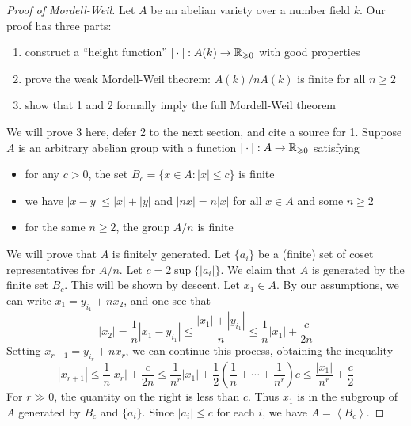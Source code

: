 \documentclass{article}
\begin{document}
\begin{proof}[Proof of Mordell-Weil]
Let $A$ be an abelian variety over a number field $k$. Our proof has three 
parts:
\begin{enumerate}
  \item construct a ``height function'' $|\cdot|:A(k)\to \mathbb{R}_{\geqslant 0}$ 
    with good properties
  \item prove the weak Mordell-Weil theorem: $A(k)/n A(k)$ is finite for all 
    $n\geqslant 2$
  \item show that 1 and 2 formally imply the full Mordell-Weil theorem 
\end{enumerate}
We will prove 3 here, defer 2 to the next section, and cite a source for 1. 
Suppose $A$ is an arbitrary abelian group with a function 
$|\cdot|:A\to \mathbb{R}_{\geqslant 0}$ satisfying 
\begin{itemize}
  \item for any $c>0$, the set $B_c = \{x\in A:|x|\leqslant c\}$ 
    is finite
  \item we have $|x-y|\leqslant |x|+|y|$ and $|n x|=n |x|$ for all 
    $x\in A$ and some $n\geqslant 2$
  \item for the same $n\geqslant 2$, the group $A/n$ is finite
\end{itemize}
We will prove that $A$ is finitely generated. Let $\{a_i\}$ be a (finite) set 
of coset representatives for $A/n$. Let $c=2\sup \{|a_i|\}$. We claim that $A$ 
is generated by the finite set $B_c$. This will be shown by 
descent. Let $x_1\in A$. By our assumptions, we can write 
$x_1 = y_{i_1} + n x_2$, and one see that 
\[
  |x_2| = \frac 1 n |x_1 - y_{i_1}| 
    \leqslant \frac{|x_1| + |y_{i_1}|}{n} 
    \leqslant \frac 1 n |x_1| + \frac{c}{2 n}
\]
Setting $x_{r+1} = y_{i_r} + n x_r$, we can continue this process, obtaining 
the inequality 
\[
  |x_{r+1}| \leqslant \frac 1 n |x_r| + \frac{c}{2 n}
    \leqslant \frac{1}{n^r} |x_1| + \frac 1 2\left(\frac 1 n + \cdots + \frac{1}{n^r}\right) c 
    \leqslant \frac{|x_1|}{n^r} + \frac c 2
\]
For $r\gg 0$, the quantity on the right is less than $c$. Thus $x_1$ is in the 
subgroup of $A$ generated by $B_c$ and $\{a_i\}$. Since $|a_i|\leqslant c$ for 
each $i$, we have $A=\left\langle B_c\right\rangle$. 
\end{proof}
\end{document}
